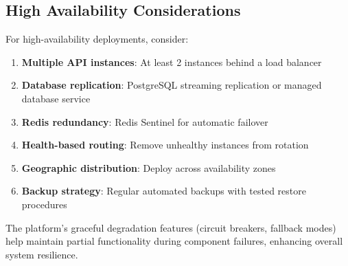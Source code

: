 \subsection{High Availability Considerations}

For high-availability deployments, consider:

\begin{enumerate}
    \item \textbf{Multiple API instances}: At least 2 instances behind a load balancer
    \item \textbf{Database replication}: PostgreSQL streaming replication or managed database service
    \item \textbf{Redis redundancy}: Redis Sentinel for automatic failover
    \item \textbf{Health-based routing}: Remove unhealthy instances from rotation
    \item \textbf{Geographic distribution}: Deploy across availability zones
    \item \textbf{Backup strategy}: Regular automated backups with tested restore procedures
\end{enumerate}

The platform's graceful degradation features (circuit breakers, fallback modes) help maintain partial functionality during component failures, enhancing overall system resilience.

